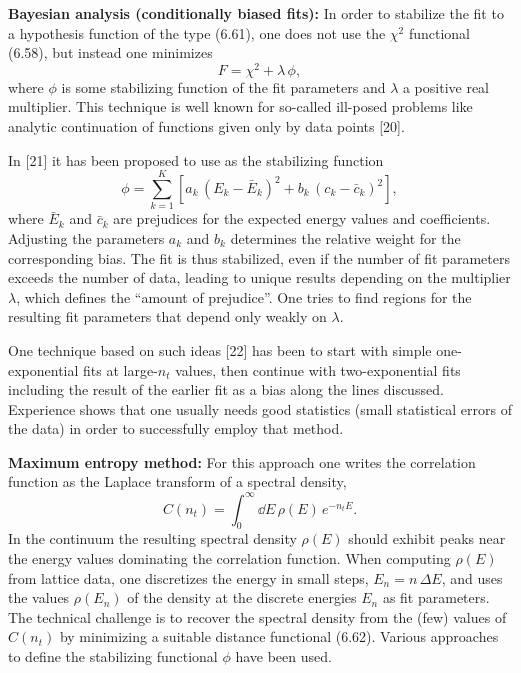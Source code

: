 \textbf{Bayesian analysis (conditionally biased fits):} In order to stabilize
the fit to a hypothesis function of the type (6.61), one does not use the
$\chi^2$ functional (6.58), but instead one minimizes
\begin{equation}
  F = \chi^2 + \lambda\, \phi ,
\end{equation}
where $\phi$ is some stabilizing function of the fit parameters and $\lambda$ a
positive real multiplier. This technique is well known for so-called ill-posed
problems like analytic continuation of functions given only by data points
[20].

In [21] it has been proposed to use as the stabilizing function
\begin{equation}
  \phi = \sum_{k=1}^{K}\left[ a_k\, (E_k - \bar{E}_k)^2
    + b_k\, (c_k - \bar{c}_k)^2 \right],
\end{equation}
where $\bar{E}_k$ and $\bar{c}_k$ are prejudices for the expected energy values
and coefficients. Adjusting the parameters $a_k$ and $b_k$ determines the
relative weight for the corresponding bias. The fit is thus stabilized, even if
the number of fit parameters exceeds the number of data, leading to unique
results depending on the multiplier $\lambda$, which defines the ``amount of
prejudice''. One tries to find regions for the resulting fit parameters that
depend only weakly on $\lambda$.

One technique based on such ideas [22] has been to start with simple
one-exponential fits at large-$n_t$ values, then continue with two-exponential
fits including the result of the earlier fit as a bias along the lines
discussed. Experience shows that one usually needs good statistics (small
statistical errors of the data) in order to successfully employ that method.

\textbf{Maximum entropy method:} For this approach one writes the correlation
function as the Laplace transform of a spectral density,
\begin{equation}
  C(n_t) = \int_0^\infty \dd E\, \rho(E)\, e^{-n_t E} .
\end{equation}
In the continuum the resulting spectral density $\rho(E)$ should exhibit peaks
near the energy values dominating the correlation function. When computing
$\rho(E)$ from lattice data, one discretizes the energy in small steps,
$E_n = n\,\Delta E$, and uses the values $\rho(E_n)$ of the density at the
discrete energies $E_n$ as fit parameters. The technical challenge is to
recover the spectral density from the (few) values of $C(n_t)$ by minimizing a
suitable distance functional (6.62). Various approaches to define the
stabilizing functional $\phi$ have been used.

